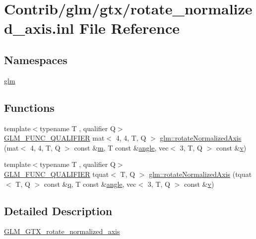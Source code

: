 \hypertarget{rotate__normalized__axis_8inl}{}\section{Contrib/glm/gtx/rotate\+\_\+normalized\+\_\+axis.inl File Reference}
\label{rotate__normalized__axis_8inl}
\subsection*{Namespaces}
\begin{DoxyCompactItemize}
\item 
 \mbox{\hyperlink{namespaceglm}{glm}}
\end{DoxyCompactItemize}
\subsection*{Functions}
\begin{DoxyCompactItemize}
\item 
{\footnotesize template$<$typename T , qualifier Q$>$ }\\\mbox{\hyperlink{setup_8hpp_a33fdea6f91c5f834105f7415e2a64407}{G\+L\+M\+\_\+\+F\+U\+N\+C\+\_\+\+Q\+U\+A\+L\+I\+F\+I\+ER}} mat$<$ 4, 4, T, Q $>$ \mbox{\hyperlink{group__gtx__rotate__normalized__axis_ga50efd7ebca0f7a603bb3cc11e34c708d}{glm\+::rotate\+Normalized\+Axis}} (mat$<$ 4, 4, T, Q $>$ const \&\mbox{\hyperlink{_s_d_l__opengl__glext_8h_af593500c283bf1a787a6f947f503a5c2}{m}}, T const \&\mbox{\hyperlink{_s_d_l__opengl__glext_8h_a9e06c1f76a20fed54ca742cd25cb02c4}{angle}}, vec$<$ 3, T, Q $>$ const \&\mbox{\hyperlink{_s_d_l__opengl_8h_a10a82eabcb59d2fcd74acee063775f90}{v}})
\item 
{\footnotesize template$<$typename T , qualifier Q$>$ }\\\mbox{\hyperlink{setup_8hpp_a33fdea6f91c5f834105f7415e2a64407}{G\+L\+M\+\_\+\+F\+U\+N\+C\+\_\+\+Q\+U\+A\+L\+I\+F\+I\+ER}} tquat$<$ T, Q $>$ \mbox{\hyperlink{group__gtx__rotate__normalized__axis_gad5bb8a155ee52fd349b88cec3a843600}{glm\+::rotate\+Normalized\+Axis}} (tquat$<$ T, Q $>$ const \&\mbox{\hyperlink{_s_d_l__opengl_8h_a8fc1e7b9baaae687804c7eed46ca09c6}{q}}, T const \&\mbox{\hyperlink{_s_d_l__opengl__glext_8h_a9e06c1f76a20fed54ca742cd25cb02c4}{angle}}, vec$<$ 3, T, Q $>$ const \&\mbox{\hyperlink{_s_d_l__opengl_8h_a10a82eabcb59d2fcd74acee063775f90}{v}})
\end{DoxyCompactItemize}


\subsection{Detailed Description}
\mbox{\hyperlink{group__gtx__rotate__normalized__axis}{G\+L\+M\+\_\+\+G\+T\+X\+\_\+rotate\+\_\+normalized\+\_\+axis}} 